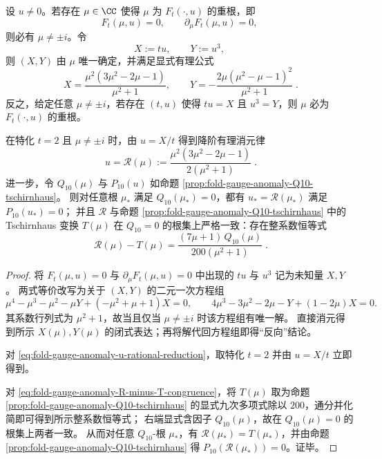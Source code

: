 \begin{proposition}\label{prop:fold-gauge-anomaly-branchpoint-rational-reduction}
设 \(u\neq 0\)。若存在 \(\mu\in\CC\) 使得 \(\mu\) 为 \(F_t(\cdot,u)\) 的重根，即
\[
F_t(\mu,u)=0,\qquad \partial_\mu F_t(\mu,u)=0,
\]
则必有 \(\mu\neq \pm i\)。令
\[
X:=tu,\qquad Y:=u^3,
\]
则 \((X,Y)\) 由 \(\mu\) 唯一确定，并满足显式有理公式
\[
\boxed{\;
X=\frac{\mu^2(3\mu^2-2\mu-1)}{\mu^2+1},\qquad
Y=-\frac{2\mu(\mu^2-\mu-1)^2}{\mu^2+1}\; }.
\]
反之，给定任意 \(\mu\neq \pm i\)，若存在 \((t,u)\) 使得 \(tu=X\) 且 \(u^3=Y\)，则 \(\mu\) 必为 \(F_t(\cdot,u)\) 的重根。
\par
在特化 \(t=2\) 且 \(\mu\neq \pm i\) 时，由 \(u=X/t\) 得到降阶有理消元律
\begin{equation}\label{eq:fold-gauge-anomaly-u-rational-reduction}
\boxed{\;
u=\mathcal R(\mu):=\frac{\mu^2(3\mu^2-2\mu-1)}{2(\mu^2+1)}\; }.
\end{equation}
进一步，令 \(Q_{10}(\mu)\) 与 \(P_{10}(u)\) 如命题 \ref{prop:fold-gauge-anomaly-Q10-tschirnhaus}。
则对任意根 \(\mu_\ast\) 满足 \(Q_{10}(\mu_\ast)=0\)，都有 \(u_\ast=\mathcal R(\mu_\ast)\) 满足 \(P_{10}(u_\ast)=0\)；
并且 \(\mathcal R\) 与命题 \ref{prop:fold-gauge-anomaly-Q10-tschirnhaus} 中的 Tschirnhaus 变换 \(T(\mu)\) 在 \(Q_{10}=0\) 的根集上严格一致：存在整系数恒等式
\begin{equation}\label{eq:fold-gauge-anomaly-R-minus-T-congruence}
\boxed{\;
\mathcal R(\mu)-T(\mu)=\frac{(7\mu+1)\,Q_{10}(\mu)}{200(\mu^2+1)}\; }.
\end{equation}
\end{proposition}
\begin{proof}
将 \(F_t(\mu,u)=0\) 与 \(\partial_\mu F_t(\mu,u)=0\) 中出现的 \(tu\) 与 \(u^3\) 记为未知量 \(X,Y\)。
两式等价改写为关于 \((X,Y)\) 的二元一次方程组
\[
\mu^4-\mu^3-\mu^2-\mu Y+(-\mu^2+\mu+1)X=0,
\qquad
4\mu^3-3\mu^2-2\mu-Y+(1-2\mu)X=0.
\]
其系数行列式为 \(\mu^2+1\)，故当且仅当 \(\mu\neq \pm i\) 时该方程组有唯一解。
直接消元得到所示 \(X(\mu),Y(\mu)\) 的闭式表达；再将解代回方程组即得“反向”结论。
\par
对 \eqref{eq:fold-gauge-anomaly-u-rational-reduction}，取特化 \(t=2\) 并由 \(u=X/t\) 立即得到。
\par
对 \eqref{eq:fold-gauge-anomaly-R-minus-T-congruence}，将 \(T(\mu)\) 取为命题 \ref{prop:fold-gauge-anomaly-Q10-tschirnhaus} 的显式九次多项式除以 \(200\)，通分并化简即可得到所示整系数恒等式；
右端显式含因子 \(Q_{10}(\mu)\)，故在 \(Q_{10}(\mu)=0\) 的根集上两者一致。
从而对任意 \(Q_{10}\)-根 \(\mu_\ast\)，有 \(\mathcal R(\mu_\ast)=T(\mu_\ast)\)，并由命题 \ref{prop:fold-gauge-anomaly-Q10-tschirnhaus} 得 \(P_{10}(\mathcal R(\mu_\ast))=0\)。证毕。
\end{proof}

